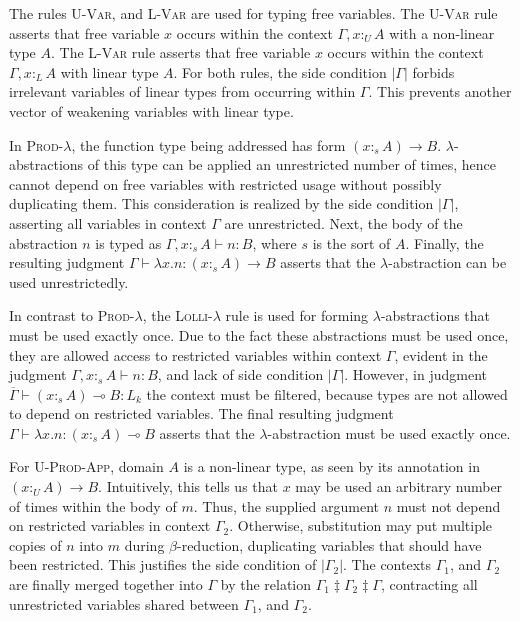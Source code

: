 \documentclass[sigplan,screen]{acmart}
\theoremstyle{definition}
\newcommand{\rname}[1]{\textsc{\footnotesize #1}}
\newcommand{\pure}[1]{|#1|}
\newcommand{\utype}{:_{\scriptscriptstyle U}}
\newcommand{\ltype}{:_{\scriptscriptstyle L}}
\newcommand{\stype}[1]{:_#1}
\newcommand{\mrg}[3]{#1\ddagger#2\ddagger#3}
\begin{document}
  The rules \rname{U-Var}, and \rname{L-Var} are used for typing free variables. The \rname{U-Var} rule asserts that free variable $x$ occurs within the context $\Gamma, x \utype A$ with a non-linear type $A$. The \rname{L-Var} rule asserts that free variable $x$ occurs within the context $\Gamma, x \ltype A$ with linear type $A$. For both rules, the side condition $\pure{\Gamma}$ forbids irrelevant variables of linear types from occurring within $\Gamma$. This prevents another vector of weakening variables with linear type.

  In \rname{Prod-$\lambda$}, the function type being addressed has form $(x \stype{s} A) \rightarrow B$. $\lambda$-abstractions of this type can be applied an unrestricted number of times, hence cannot depend on free variables with restricted usage without possibly duplicating them. This consideration is realized by the side condition $\pure{\Gamma}$, asserting all variables in context $\Gamma$ are unrestricted. Next, the body of the abstraction $n$ is typed as $\Gamma, x \stype{s} A \vdash n : B$, where $s$ is the sort of $A$. Finally, the resulting judgment $\Gamma \vdash \lambda x.n : (x \stype{s} A) \rightarrow B$ asserts that the $\lambda$-abstraction can be used unrestrictedly.

  In contrast to \rname{Prod-$\lambda$}, the \rname{Lolli-$\lambda$} rule is used for forming $\lambda$-abstractions that must be used exactly once. Due to the fact these abstractions must be used once, they are allowed access to restricted variables within context $\Gamma$, evident in the judgment $\Gamma, x \stype{s} A \vdash n : B$, and lack of side condition $\pure{\Gamma}$. However, in judgment $\overline{\Gamma} \vdash (x \stype{s} A) \multimap B : L_k$ the context must be filtered, because types are not allowed to depend on restricted variables. The final resulting judgment $\Gamma \vdash \lambda x.n : (x \stype{s} A) \multimap B$ asserts that the $\lambda$-abstraction must be used exactly once.
  
  For \rname{U-Prod-App}, domain $A$ is a non-linear type, as seen by its annotation in $(x \utype A) \rightarrow B$. Intuitively, this tells us that $x$ may be used an arbitrary number of times within the body of $m$. Thus, the supplied argument $n$ must not depend on restricted variables in context $\Gamma_2$. Otherwise, substitution may put multiple copies of $n$ into $m$ during $\beta$-reduction, duplicating variables that should have been restricted. This justifies the side condition of $\pure{\Gamma_2}$. The contexts $\Gamma_1$, and $\Gamma_2$ are finally merged together into $\Gamma$ by the relation $\mrg{\Gamma_1}{\Gamma_2}{\Gamma}$, contracting all unrestricted variables shared between $\Gamma_1$, and $\Gamma_2$.
  
\end{document}

